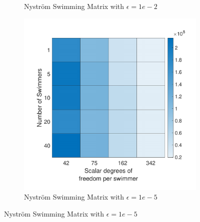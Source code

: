 \begin{figure}
\begin{subfigure}{0.3\textwidth}
        \caption{Nyström Swimming Matrix with $\epsilon=1e-2$}
    \end{subfigure}
    \begin{subfigure}{0.3\textwidth}
        \includegraphics[width=\linewidth]{Images/Condition/Mobility matrix-5.pdf}
        \caption{Nyström Swimming Matrix with $\epsilon=1e-5$}
    \end{subfigure}
\end{figure}


